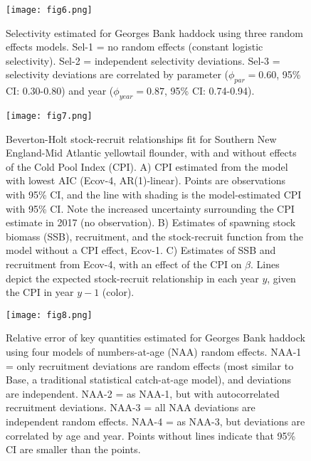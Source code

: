 \documentclass[]{article}
\begin{document}
\pagebreak

\begin{figure}

{\centering \texttt{[image: fig6.png]} 

}

\caption{Selectivity estimated for Georges Bank haddock using three random effects models. Sel-1 = no random effects (constant logistic selectivity). Sel-2 = independent selectivity deviations. Sel-3 = selectivity deviations are correlated by parameter ($\phi_{par} = 0.60$, 95\% CI: 0.30-0.80) and year ($\phi_{year} = 0.87$, 95\% CI: 0.74-0.94).}\label{fig:devs-GBhaddock-sel}
\end{figure}

\pagebreak

\begin{figure}

{\centering \texttt{[image: fig7.png]} 

}

\caption{Beverton-Holt stock-recruit relationships fit for Southern New England-Mid Atlantic yellowtail flounder, with and without effects of the Cold Pool Index (CPI). A) CPI estimated from the model with lowest AIC (Ecov-4, AR(1)-linear). Points are observations with 95\% CI, and the line with shading is the model-estimated CPI with 95\% CI. Note the increased uncertainty surrounding the CPI estimate in 2017 (no observation). B) Estimates of spawning stock biomass (SSB), recruitment, and the stock-recruit function from the model without a CPI effect, Ecov-1. C) Estimates of SSB and recruitment from Ecov-4, with an effect of the CPI on $\beta$. Lines depict the expected stock-recruit relationship in each year $y$, given the CPI in year $y-1$ (color).}\label{fig:devs-SNEMAYT-ecov}
\end{figure}

\pagebreak

\begin{figure}

{\centering \texttt{[image: fig8.png]} 

}

\caption{Relative error of key quantities estimated for Georges Bank haddock using four models of numbers-at-age (NAA) random effects. NAA-1 = only recruitment deviations are random effects (most similar to Base, a traditional statistical catch-at-age model), and deviations are independent. NAA-2 = as NAA-1, but with autocorrelated recruitment deviations. NAA-3 = all NAA deviations are independent random effects. NAA-4 = as NAA-3, but deviations are correlated by age and year. Points without lines indicate that 95\% CI are smaller than the points.}\label{fig:rel-error-GBhaddock-naa}
\end{figure}
\end{document}
